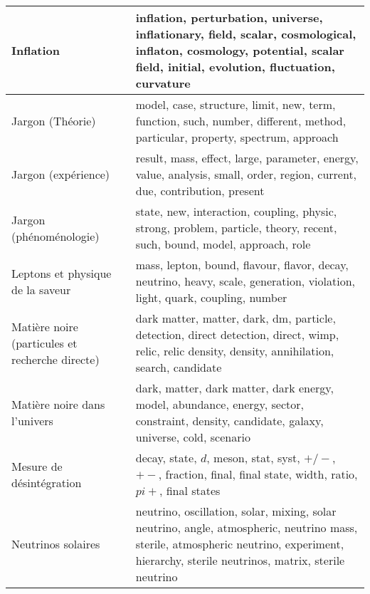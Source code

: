 \begin{longtable}[H]{p{}|p{}}
Inflation                                                       &                                     inflation, perturbation, universe, inflationary, field, scalar, cosmological, inflaton, cosmology, potential, scalar field, initial, evolution, fluctuation, curvature \\ \midrule
Jargon (Théorie)                                                &                                                                              model, case, structure, limit, new, term, function, such, number, different, method, particular, property, spectrum, approach \\ \midrule
Jargon (expérience)                                             &                                                                                 result, mass, effect, large, parameter, energy, value, analysis, small, order, region, current, due, contribution, present \\ \midrule
Jargon (phénoménologie)                                         &                                                                                   state, new, interaction, coupling, physic, strong, problem, particle, theory, recent, such, bound, model, approach, role \\ \midrule
Leptons et physique de la saveur                                &                                                                                 mass, lepton, bound, flavour, flavor, decay, neutrino, heavy, scale, generation, violation, light, quark, coupling, number \\ \midrule
Matière noire (particules et recherche directe)                 &                                                         dark matter, matter, dark, dm, particle, detection, direct detection, direct, wimp, relic, relic density, density, annihilation, search, candidate \\ \midrule
Matière noire dans l'univers                                    &                                                                 dark, matter, dark matter, dark energy, model, abundance, energy, sector, constraint, density, candidate, galaxy, universe, cold, scenario \\ \midrule
Mesure de désintégration                                        &                                                                                         decay, state, $d$, meson, stat, syst, $+/-$, $+-$, fraction, final, final state, width, ratio, $pi+$, final states \\ \midrule
Neutrinos solaires                                              &                 neutrino, oscillation, solar, mixing, solar neutrino, angle, atmospheric, neutrino mass, sterile, atmospheric neutrino, experiment, hierarchy, sterile neutrinos, matrix, sterile neutrino \\ \midrule

\end{longtable}
